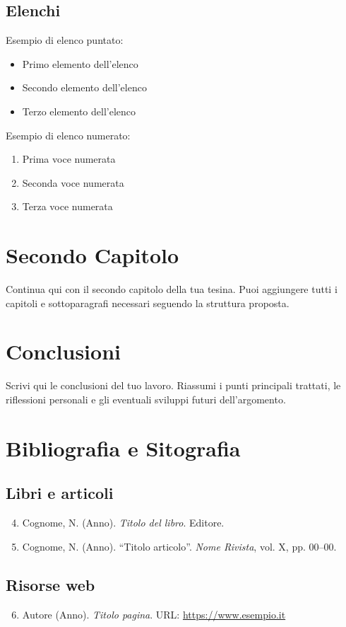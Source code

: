 \documentclass[12pt,a4paper]{report}
\begin{document}
\subsection{Elenchi}
Esempio di elenco puntato:
\begin{itemize}
\item Primo elemento dell'elenco
\item Secondo elemento dell'elenco
\item Terzo elemento dell'elenco
\end{itemize}

Esempio di elenco numerato:
\begin{enumerate}
\item Prima voce numerata
\item Seconda voce numerata
\item Terza voce numerata
\end{enumerate}

\section{Secondo Capitolo}
Continua qui con il secondo capitolo della tua tesina. Puoi aggiungere tutti i capitoli e sottoparagrafi necessari seguendo la struttura proposta.

\section{Conclusioni}
Scrivi qui le conclusioni del tuo lavoro. Riassumi i punti principali trattati, le riflessioni personali e gli eventuali sviluppi futuri dell'argomento.

\section{Bibliografia e Sitografia}

\subsection{Libri e articoli}
\begin{enumerate}
\setcounter{enumi}{3}
\item Cognome, N. (Anno). \textit{Titolo del libro}. Editore.
\item Cognome, N. (Anno). ``Titolo articolo''. \textit{Nome Rivista}, vol. X, pp. 00–00.
\end{enumerate}

\subsection{Risorse web}
\begin{enumerate}
\setcounter{enumi}{5}
\item Autore (Anno). \textit{Titolo pagina}. URL: \url{https://www.esempio.it}
\end{enumerate}
\end{document}
